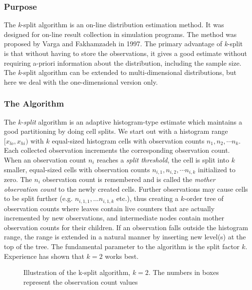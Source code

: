 \subsubsection{Purpose}
\label{sec:sim-lib:ksplit-purpose}

The \textit{k}-split algorithm is an on-line distribution
estimation method.  It was
designed for on-line result collection in simulation programs.  The
method was proposed by Varga and Fakhamzadeh in 1997. The primary
advantage of \textit{k}-split is that without having to store the
observations, it gives a good estimate without requiring a-priori
information about the distribution, including the sample size. The
\textit{k}-split algorithm can be extended to multi-dimensional
distributions, but here we deal
with the one-dimensional version only.


\subsubsection{The Algorithm}
\label{sec:sim-lib:ksplit-algorithm}

The \textit{k-split} algorithm is an adaptive histogram-type estimate which
maintains a good partitioning by doing cell splits. We start out with
a histogram range $[x_{lo}, x_{hi})$ with $k$ equal-sized histogram
cells with observation counts $n_1,n_2, \cdots n_k$.  Each collected
observation increments the corresponding observation count. When an
observation count $n_i$ reaches a \textit{split threshold}, the cell
is split into $k$ smaller, equal-sized cells with observation counts
$n_{i,1}, n_{i,2}, \cdots n_{i,k}$ initialized to zero. The $n_i$
observation count is remembered and is called the \textit{mother
  observation count} to the newly created cells. Further observations
may cause cells to be split further (e.g. $n_{i,1,1},...n_{i,1,k}$
etc.), thus creating a $k$-order tree of observation counts where
leaves contain live counters that are actually incremented by new
observations, and intermediate nodes contain mother observation counts
for their children. If an observation falls outside the histogram
range, the range is extended in a natural manner by inserting new
level(s) at the top of the tree. The fundamental parameter to the
algorithm is the split factor $k$. Experience has shown that $k=2$
works best.

\begin{figure}[htbp]
  \begin{center}
    
    \caption{Illustration of the k-split algorithm, $k=2$. The
      numbers in boxes represent the observation count values}
  \end{center}
\end{figure}


